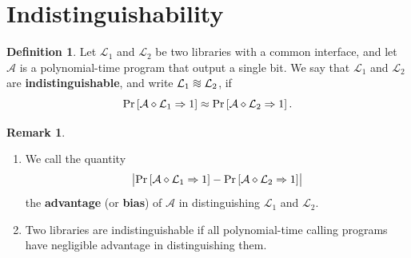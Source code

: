 \documentclass[12pt,openany]{book}
\theoremstyle{definition}
\newtheorem{definition}{Definition}[chapter]
\newtheorem{remark}{Remark}[chapter]
\renewcommand{\abs}[1]{\left\lvert #1 \right\rvert}
\newcommand{\library}{\mathcal{L}}
\newcommand{\adversary}{\mathcal{A}}
\newcommand{\linking}{\diamond}
\newcommand*{\indist}{%
	\mathrel{\vcenter{\offinterlineskip
			\hbox{$\sim$}\vskip-.35ex\hbox{$\sim$}\vskip-.35ex\hbox{$\sim$}}}}
\newcommand{\outputs}{\Rightarrow}
\begin{document}
	\section{Indistinguishability}
	\begin{tcolorbox}[colframe=defcolor,title={\color{white}\bf Indistinguishable ($\indist$)}]
		\begin{definition}
			Let \(\library_{1}\) and \(\library_{2}\) be two libraries with a common interface, and let \(\adversary\) is a polynomial-time program that output a single bit. We say that \(\library_1\) and \(\library_2\) are \textbf{indistinguishable}, and write \(\library_{1}\indist\library_{2}\), if \[
			\Pr\sbr{\adversary\linking\library_{1}\outputs 1}\approx
			\Pr\sbr{\adversary\linking\library_{2}\outputs 1}.
			\]
		\end{definition}
	\end{tcolorbox}
	\begin{remark}
		\ \begin{enumerate}[(1)]
			\item We call the quantity \[
			\abs{\Pr\sbr{\adversary\linking\library_{1}\outputs 1}-
			\Pr\sbr{\adversary\linking\library_{2}\outputs 1}}
			\] the \textbf{advantage} (or \textbf{bias}) of \(\adversary\) in distinguishing \(\library_{1}\) and \(\library_{2}\).
			\item Two libraries are indistinguishable if all polynomial-time calling programs have negligible advantage in distinguishing them.
		\end{enumerate}
	\end{remark}
	\vspace{10pt}
\end{document}

